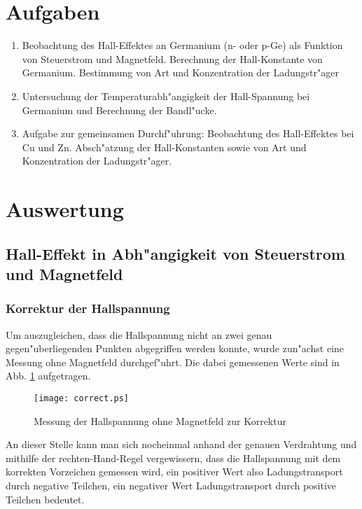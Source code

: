 \documentclass[a4paper,10pt]{article}
\begin{document}
\section{Aufgaben}
\begin{enumerate}
\item Beobachtung des Hall-Effektes an Germanium (n- oder p-Ge) als Funktion von Steuerstrom und Magnetfeld. Berechnung der Hall-Konstante von Germanium. Bestimmung von Art und Konzentration der Ladungstr"ager
\item Untersuchung der Temperaturabh"angigkeit der Hall-Spannung bei Germanium und Berechnung der Bandl"ucke.
\item Aufgabe zur gemeinsamen Durchf"uhrung: Beobachtung des Hall-Effektes bei Cu und Zn. Absch"atzung der Hall-Konstanten sowie von Art und Konzentration der Ladungstr"ager.
\end{enumerate}





\section{Auswertung}

\subsection{Hall-Effekt in Abh"angigkeit von Steuerstrom und Magnetfeld}
\subsubsection*{Korrektur der Hallspannung}
Um auszugleichen, dass die Hallspannung nicht an zwei genau gegen"uberliegenden Punkten abgegriffen werden konnte, wurde zun"achst eine Messung ohne Magnetfeld durchgef"uhrt. Die dabei gemessenen Werte sind in Abb. \ref{correctplot} aufgetragen.

\begin{figure}[p]
    \centering
         \texttt{[image: correct.ps]}
         \caption{Messung der Hallspannung ohne Magnetfeld zur Korrektur}
       \label{correctplot}
\end{figure}

An dieser Stelle kann man sich nocheinmal anhand der genauen Verdrahtung und mithilfe der rechten-Hand-Regel vergewissern, dass die Hallspannung mit dem korrekten Vorzeichen gemessen wird, ein positiver Wert also Ladungstransport durch negative Teilchen, ein negativer Wert Ladungstransport durch positive Teilchen bedeutet.
\end{document}
